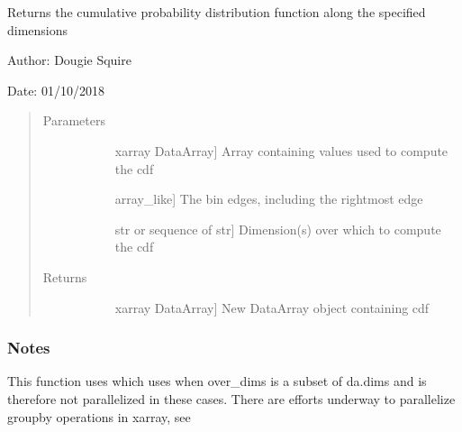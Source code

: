 \documentclass[letterpaper,10pt,english]{sphinxmanual}
\begin{document}

\begin{fulllineitems}
\label{\detokenize{utils_doc:utils.cdf}}
Returns the cumulative probability distribution function along the specified dimensions

\begin{DUlineblock}{0em}
\item[] Author: Dougie Squire
\item[] Date: 01/10/2018
\end{DUlineblock}
\begin{quote}\begin{description}
\item[{Parameters}] \leavevmode\begin{description}
\item[{}] \leavevmode{[}xarray DataArray{]}
Array containing values used to compute the cdf

\item[{}] \leavevmode{[}array\_like{]}
The bin edges, including the rightmost edge

\item[{}] \leavevmode{[}str or sequence of str{]}
Dimension(s) over which to compute the cdf

\end{description}

\item[{Returns}] \leavevmode\begin{description}
\item[{}] \leavevmode{[}xarray DataArray{]}
New DataArray object containing cdf

\end{description}

\end{description}\end{quote}
\subsubsection*{Notes}

This function uses  which uses  when over\_dims is a subset                 of da.dims and is therefore not parallelized in these cases. There are efforts underway to parallelize                 groupby operations in xarray, see 

\end{fulllineitems}
\end{document}
